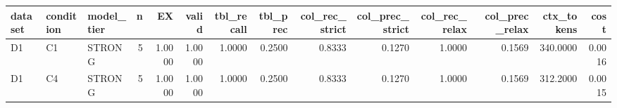 \begin{tabular}{lllrrrrrrrrrrr}
\toprule
dataset & condition & model\_tier & n & EX & valid & tbl\_recall & tbl\_prec & col\_rec\_strict & col\_prec\_strict & col\_rec\_relax & col\_prec\_relax & ctx\_tokens & cost \\
\midrule
D1 & C1 & STRONG & 5 & 1.0000 & 1.0000 & 1.0000 & 0.2500 & 0.8333 & 0.1270 & 1.0000 & 0.1569 & 340.0000 & 0.0016 \\
D1 & C4 & STRONG & 5 & 1.0000 & 1.0000 & 1.0000 & 0.2500 & 0.8333 & 0.1270 & 1.0000 & 0.1569 & 312.2000 & 0.0015 \\
\bottomrule
\end{tabular}
